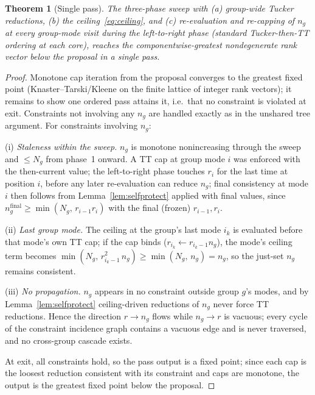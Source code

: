 \documentclass[11pt]{article}
\newtheorem{theorem}{Theorem}[section]
\theoremstyle{definition}
\theoremstyle{remark}
\begin{document}
\begin{theorem}[Single pass]\label{thm:singlepass}
The three-phase sweep with (a) group-wide Tucker reductions, (b) the
ceiling~\eqref{eq:ceiling}, and (c) re-evaluation and re-capping of $n_g$ at
every group-mode visit during the left-to-right phase (standard
Tucker-then-TT ordering at each core), reaches the componentwise-greatest
nondegenerate rank vector below the proposal in a single pass.
\end{theorem}

\begin{proof}
Monotone cap iteration from the proposal converges to the greatest fixed
point (Knaster--Tarski/Kleene on the finite lattice of integer rank vectors);
it remains to show one ordered pass attains it, i.e.\ that no constraint is
violated at exit. Constraints not involving any $n_g$ are handled exactly as
in the unshared tree argument. For constraints involving $n_g$:

(i) \emph{Staleness within the sweep.} $n_g$ is monotone nonincreasing
through the sweep and $\leq N_g$ from phase~1 onward. A TT cap at group mode
$i$ was enforced with the then-current value; the left-to-right phase touches
$r_i$ for the last time at position $i$, before any later re-evaluation can
reduce $n_g$; final consistency at mode $i$ then follows from
Lemma~\ref{lem:selfprotect} applied with final values, since
$n_g^{\mathrm{final}} \geq \min(N_g,\, r_{i-1} r_i)$ with the final (frozen)
$r_{i-1}, r_i$.

(ii) \emph{Last group mode.} The ceiling at the group's last mode $i_k$ is
evaluated before that mode's own TT cap; if the cap binds
($r_{i_k} \leftarrow r_{i_k-1} n_g$), the mode's ceiling term becomes
$\min(N_g,\, r_{i_k-1}^2\, n_g) \geq \min(N_g,\, n_g) = n_g$, so the just-set
$n_g$ remains consistent.

(iii) \emph{No propagation.} $n_g$ appears in no constraint outside group
$g$'s modes, and by Lemma~\ref{lem:selfprotect} ceiling-driven reductions of
$n_g$ never force TT reductions. Hence the direction
$r \to n_g$ flows while $n_g \to r$ is vacuous; every cycle of the constraint
incidence graph contains a vacuous edge and is never traversed, and no
cross-group cascade exists.

At exit, all constraints hold, so the pass output is a fixed point; since
each cap is the loosest reduction consistent with its constraint and caps are
monotone, the output is the greatest fixed point below the proposal.
\end{proof}
\end{document}
